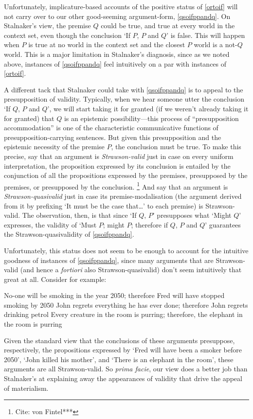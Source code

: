 \documentclass[If.tex]{subfiles}
\begin{document}
Unfortunately, implicature-based accounts of the positive status of \ref{ortoif} will not carry over to our other good-seeming argument-form, \ref{qsoifppandq}.  On Stalnaker's view, the premise $Q$ could be true, and true at every world in the context set, even though the conclusion ‘If $P$, $P$ and $Q$’ is false.  This will happen when $P$ is true at no world in the context set and the closest $P$ world is a not-$Q$ world.  This is a major limitation in Stalnaker's diagnosis, since as we noted above, instances of \ref{qsoifppandq} feel intuitively on a par with instances of \ref{ortoif}.  

A different tack that Stalnaker could take with \ref{qsoifppandq} is to appeal to the presupposition of validity.  Typically, when we hear someone utter the conclusion ‘If $Q$, $P$ and $Q$’, we will start taking it for granted (if we weren't already taking it for granted) that $Q$ is an epistemic possibility---this process of “presupposition accommodation” is one of the characteristic communicative functions of presupposition-carrying sentences.  But given this presupposition and the epistemic necessity of the premise $P$, the conclusion must be true.  To make this precise, say that an argument is \emph{Strawson-valid} just in case on every uniform interpretation, the proposition expressed by its conclusion is entailed by the conjunction of all the propositions expressed by the premises, presupposed by the premises, or presupposed by the conclusion.%
\footnote{Cite: von Fintel***}  
And say that an argument is \emph{Strawson-quasivalid} just in case its premise-modalisation (the argument derived from it by prefixing ‘It must be the case that…’ to each premise) is Strawson-valid.  The observation, then, is that since ‘If $Q$, $P$’ presupposes what ‘Might $Q$’ expresses, the validity of ‘Must $P$; might $P$; therefore if $Q$, $P$ and $Q$’ guarantees the Strawson-quasivalidity of \ref{qsoifppandq}.  

Unfortunately, this status does not seem to be enough to account for the intuitive goodness of instances of \ref{qsoifppandq}, since many arguments that are Strawson-valid (and hence a \emph{fortiori} also Strawson-quasivalid) don't seem intuitively that great at all.  Consider for example:
\begin{prop}
	\nitem 
	No-one will be smoking in the year 2050; therefore Fred will have stopped smoking by 2050
	\nitem 
	John regrets everything he has ever done; therefore John regrets drinking petrol
	\nitem 
	Every creature in the room is purring; therefore, the elephant in the room is purring
\end{prop}
Given the standard view that the conclusions of these arguments presuppose, respectively, the propositions expressed by ‘Fred will have been a smoker before 2050’, ‘John killed his mother’, and ‘There is an elephant in the room’, these arguments are all Strawson-valid.  So \emph{prima facie}, our view does a better job than Stalnaker's at explaining away the appearances of validity that drive the appeal of materialism.
\end{document}
